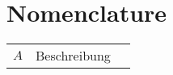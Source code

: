 \section*{Nomenclature}
\renewcommand{\arraystretch}{1.0}
\begin{longtable}[l]{@{}lp{12.25cm}l@{}}
	$A$               &Beschreibung                                   
\end{longtable}
\addtocounter{table}{-1}